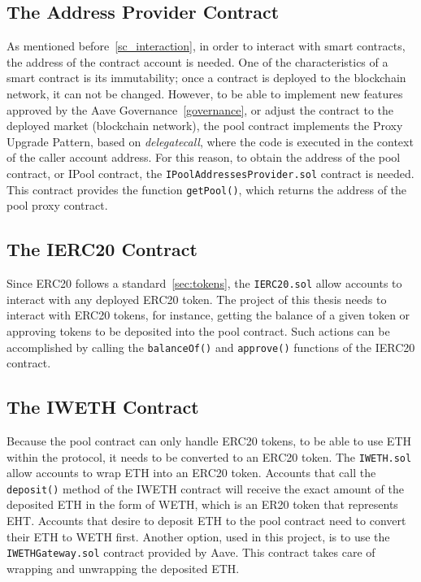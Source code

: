 \documentclass[11pt,a4paper]{report}
\begin{document}
\subsection{The Address Provider Contract}
As mentioned before~\ref{sc_interaction}, in order to interact with smart contracts, the address of the contract account is needed. One of the characteristics of a smart contract is its immutability; once a contract is deployed to the blockchain network, it can not be changed. However, to be able to implement new features approved by the Aave Governance~\ref{governance}, or adjust the contract to the deployed market (blockchain network), the pool contract implements the Proxy Upgrade Pattern\cite{ozproxy}, based on \textit{delegatecall}\cite{delegatecall}, where the code is executed in the context of the caller account address. For this reason, to obtain the address of the pool contract, or IPool contract, the \verb|IPoolAddressesProvider.sol|\cite{pooladdrprov} contract is needed. This contract provides the function \verb|getPool()|, which returns the address of the pool proxy contract.

\subsection{The IERC20 Contract}
Since ERC20 follows a standard~\ref{sec:tokens}, the \verb|IERC20.sol| allow accounts to interact with any deployed ERC20 token. The project of this thesis needs to interact with ERC20 tokens, for instance, getting the balance of a given token or approving tokens to be deposited into the pool contract. Such actions can be accomplished by calling the \verb|balanceOf()| and \verb|approve()| functions of the IERC20 contract.
\subsection{The IWETH Contract}
Because the pool contract can only handle ERC20 tokens, to be able to use ETH within the protocol, it needs to be converted to an ERC20 token. The \verb|IWETH.sol|\cite{WETH} allow accounts to wrap ETH into an ERC20 token. Accounts that call the \verb|deposit()| method of the IWETH contract will receive the exact amount of the deposited ETH in the form of WETH, which is an ER20 token that represents EHT. Accounts that desire to deposit ETH to the pool contract need  to convert their ETH to WETH first. Another option, used in this project, is to use the \verb|IWETHGateway.sol|\cite{wethgateway} contract provided by Aave. This contract takes care of wrapping and unwrapping the deposited ETH.
\end{document}
